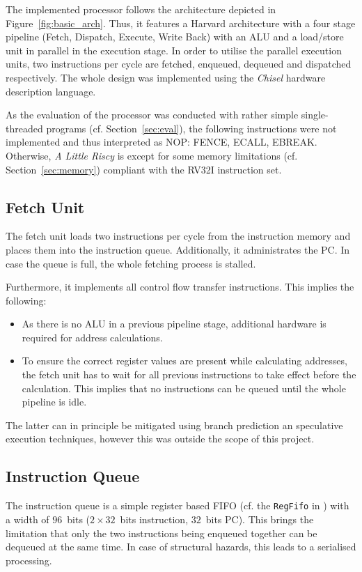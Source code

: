 \documentclass[conference]{IEEEtran}
\begin{document}
The implemented processor follows the architecture depicted in Figure~\ref{fig:basic_arch}. Thus, it features a Harvard architecture with a four stage pipeline (Fetch, Dispatch, Execute, Write Back) with an ALU and a load/store unit in parallel in the execution stage. In order to utilise the parallel execution units, two instructions per cycle are fetched, enqueued, dequeued and dispatched respectively. The whole design was implemented using the \emph{Chisel} hardware description language.

As the evaluation of the processor was conducted with rather simple single-threaded programs (cf. Section~\ref{sec:eval}), the following instructions were not implemented and thus interpreted as NOP: FENCE, ECALL, EBREAK. Otherwise, \emph{A Little Riscy} is except for some memory limitations (cf. Section~\ref{sec:memory}) compliant with the RV32I instruction set.


\subsection{Fetch Unit}
The fetch unit loads two instructions per cycle from the instruction memory and places them into the instruction queue. Additionally, it administrates the PC. In case the queue is full, the whole fetching process is stalled.

Furthermore, it implements all control flow transfer instructions. This implies the following:
\begin{itemize}
	\item As there is no ALU in a previous pipeline stage, additional hardware is required for address calculations.
	\item To ensure the correct register values are present while calculating addresses, the fetch unit has to wait for all previous instructions to take effect before the calculation. This implies that no instructions can be queued until the whole pipeline is idle.
\end{itemize}

The latter can in principle be mitigated using branch prediction an speculative execution techniques, however this was outside the scope of this project.

\subsection{Instruction Queue}
The instruction queue is a simple register based FIFO (cf. the \verb|RegFifo| in \cite{schoeberl}) with a width of $96$~bits ($2\times32$~bits instruction, $32$~bits PC). This brings the limitation that only the two instructions being enqueued together can be dequeued at the same time. In case of structural hazards, this leads to a serialised processing.
\end{document}
